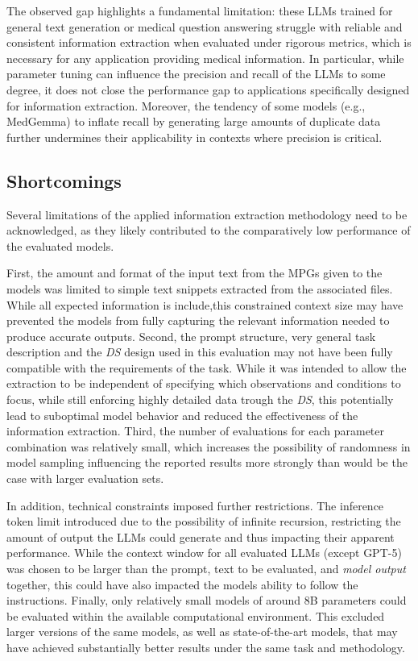 \documentclass[bs, english]{stthesis}
\begin{document}
The observed gap highlights a fundamental limitation: these LLMs trained for general text generation or medical question answering struggle with reliable and consistent information extraction when evaluated under rigorous metrics, which is necessary for any application providing medical information. In particular, while parameter tuning can influence the precision and recall of the LLMs to some degree, it does not close the performance gap to applications specifically designed for information extraction. Moreover, the tendency of some models (e.g., MedGemma) to inflate recall by generating large amounts of duplicate data further undermines their applicability in contexts where precision is critical.

\subsection{Shortcomings}

Several limitations of the applied information extraction methodology need to be acknowledged, as they likely contributed to the comparatively low performance of the evaluated models. 

First, the amount and format of the input text from the MPGs given to the models was limited to simple text snippets extracted from the associated files. While all expected information is include,this constrained context size may have prevented the models from fully capturing the relevant information needed to produce accurate outputs.
Second, the prompt structure, very general task description and the \textit{DS} design used in this evaluation may not have been fully compatible with the requirements of the task. While it was intended to allow the extraction to be independent of specifying which observations and conditions to focus, while still enforcing highly detailed data trough the \textit{DS}, this potentially lead to suboptimal model behavior and reduced the effectiveness of the information extraction. 
Third, the number of evaluations for each parameter combination was relatively small, which increases the possibility of randomness in model sampling influencing the reported results more strongly than would be the case with larger evaluation sets. 

In addition, technical constraints imposed further restrictions. The inference token limit introduced due to the possibility of infinite recursion, restricting the amount of output the LLMs could generate and thus impacting their apparent performance. While the context window for all evaluated LLMs (except GPT-5) was chosen to be larger than the prompt, text to be evaluated, and \textit{model output} together, this could have also impacted the models ability to follow the instructions. 
Finally, only relatively small models of around 8B parameters could be evaluated within the available computational environment. This excluded larger versions of the same models, as well as state-of-the-art models, that may have achieved substantially better results under the same task and methodology.
\end{document}
